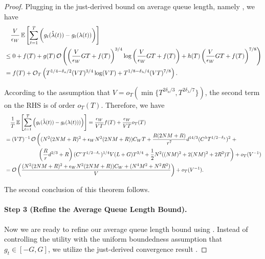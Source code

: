 \documentclass[11pt,fullpage,letterpaper]{article} %
\renewcommand{\bm}[1]{#1}%
\renewcommand{\O}{\operatorname{\mathcal O}}
\newcommand{\E}{\operatornamewithlimits{\mathbb{E}}}
\begin{document}
\begin{proof}
Plugging in the just-derived bound on average queue length, namely , we have
\begin{align*}
&\quad \frac{V}{\epsilon_W} \E\left [\sum_{t=1}^T \bigg (g_t(\mathring{\bm \lambda}(t)) - g_t(\bm \lambda(t))\bigg )\right ]\\
&\le 0 + f(T) + g(T) \O\left (\left (\frac{V}{\epsilon_W} GT + f(T)\right )^{3/4} \log \left (\frac{V}{\epsilon_W} GT + f(T)\right ) + h(T) \left (\frac{V}{\epsilon_W} GT + f(T)\right )^{7/8}\right )\\
&=f(T) + \O_T \left (T^{1/4 - \delta_a/2} (VT)^{3/4} \log(VT) + T^{1/8 - \delta_\lambda / 4} (VT)^{7/8}\right ).
\end{align*}

According to the assumption that $V=o_T(\min\{T^{2\delta_a/3},T^{2\delta_\lambda/7}\})$, the second term on the RHS is of order $o_T(T)$. Therefore, we have
\begin{align}
&\quad \frac 1T \E\left [\sum_{t=1}^T \left (g_t(\mathring{\bm \lambda}(t)) - g_t(\bm \lambda(t)))\right )\right ]=\frac{\epsilon_W}{VT} f(T) + \frac{\epsilon_W}{VT} o_T(T) \nonumber \\
&=(VT)^{-1} \O\left ((N^2 (2NM+R)^2 + \epsilon_W N^2 (2NM+R)) C_W T + \frac{R(2NM+R)}{r^7} d^{14/3} (C^\lambda T^{1/2 - \delta_\lambda})^2\right .+ \nonumber\\
&\qquad \qquad \qquad \left .\left (\frac{R}{r} d^{2/3}+R\right ) (C^r T^{1/2 - \delta_r})^{1/4} V(L+G) T^{3/4}+\frac 12 N^2 ((NM)^2+2(NM)^2+2R^2) T\right )+o_T(V^{-1}) \nonumber\\
&=\O\left (\frac{(N^2 (2NM+R)^2 + \epsilon_W N^2 (2NM+R)) C_W + (N^4 M^2+N^2 R^2)}{V}\right ) + o_T(V^{-1}). \label{eq:refined utility bound}
\end{align}

The second conclusion of this theorem follows.

\paragraph{Step 3 (Refine the Average Queue Length Bound).}
Now we are ready to refine our average queue length bound using . Instead of controlling the utility with the uniform boundedness assumption that $g_t\in [-G,G]$, we utilize the just-derived convergence result .


\end{proof}
\end{document}
